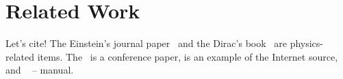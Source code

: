 \chapter{Related Work}
Let's cite! The Einstein's journal paper~\cite{einstein} and the Dirac's 
book~\cite{dirac} are physics-related items. The~\cite{Chien_2019} is a conference paper, \cite{cpu_freq} is an example of the Internet source, and ~\cite{gpudirect} -- manual.